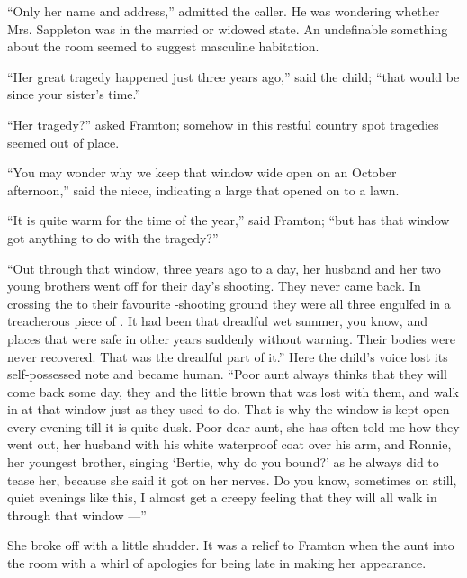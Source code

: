 \documentclass{fiche}
\begin{document}
\begin{texte}
``Only her name and address,'' admitted the caller. He was wondering whether Mrs. Sappleton
was in the married or widowed state. An undefinable something about the room seemed to
suggest masculine habitation.

``Her great tragedy happened just three years ago,'' said the child; ``that would be since
your sister's time.''

``Her tragedy?'' asked Framton; somehow in this restful country spot tragedies seemed out of
place.

``You may wonder why we keep that window wide open on an October afternoon,'' said the niece,
indicating a large  that opened on to a
lawn.

``It is quite warm for the time of the year,'' said Framton; ``but has that window got
anything to do with the tragedy?''

``Out through that window, three years ago to a day, her husband and her two young brothers
went off for their day's shooting. They never came back. In crossing the
 to their favourite -shooting
ground they were all three engulfed in a treacherous piece of . It had been that dreadful wet summer, you know, and places that were
safe in other years  suddenly without warning.
Their bodies were never recovered. That was the dreadful part of it.'' Here the child's voice
lost its self-possessed note and became  human. ``Poor aunt always thinks that they will come back some day, they and the
little brown  that was lost with them, and walk in at
that window just as they used to do. That is why the window is kept open every evening till
it is quite dusk. Poor dear aunt, she has often told me how they went out, her husband with
his white waterproof coat over his arm, and Ronnie, her youngest brother, singing `Bertie,
why do you bound?' as he always did to tease her, because she said it got on her nerves. Do
you know, sometimes on still, quiet evenings like this, I almost get a creepy feeling that
they will all walk in through that window ---''

She broke off with a little shudder. It was a relief to Framton when the aunt
 into the room with a whirl of apologies for
being late in making her appearance.


\end{texte}
\end{document}
